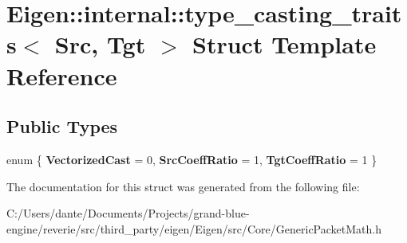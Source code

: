 \hypertarget{struct_eigen_1_1internal_1_1type__casting__traits}{}\section{Eigen\+::internal\+::type\+\_\+casting\+\_\+traits$<$ Src, Tgt $>$ Struct Template Reference}
\label{struct_eigen_1_1internal_1_1type__casting__traits}
\subsection*{Public Types}
\begin{DoxyCompactItemize}
\item 
\mbox{\label{struct_eigen_1_1internal_1_1type__casting__traits_a33b15586aa9fe952f5a81cbbef8c62ae}} 
enum \{ {\bfseries Vectorized\+Cast} = 0, 
{\bfseries Src\+Coeff\+Ratio} = 1, 
{\bfseries Tgt\+Coeff\+Ratio} = 1
 \}
\end{DoxyCompactItemize}


The documentation for this struct was generated from the following file\+:\begin{DoxyCompactItemize}
\item 
C\+:/\+Users/dante/\+Documents/\+Projects/grand-\/blue-\/engine/reverie/src/third\+\_\+party/eigen/\+Eigen/src/\+Core/Generic\+Packet\+Math.\+h\end{DoxyCompactItemize}
